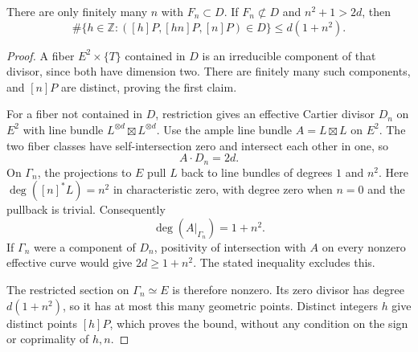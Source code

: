 \documentclass[10pt,a4paper]{article}
\newcommand{\Z}{\mathbb Z}\newcommand{\Q}{\mathbb Q}
\begin{document}
\begin{proposition}\label{prop:bound}
There are only finitely many $n$ with $F_n\subset D$.
If $F_n\not\subset D$ and $n^2+1>2d$, then
\[
 \#\{h\in\Z:([h]P,[hn]P,[n]P)\in D\}
                       \le d(1+n^2).
\]
\end{proposition}
\begin{proof}
A fiber $E^2\times\{T\}$ contained in $D$ is an irreducible component
of that divisor, since both have dimension two. There are finitely
many such components, and $[n]P$ are distinct, proving the first claim.

For a fiber not contained in $D$, restriction gives an effective
Cartier divisor $D_n$ on $E^2$ with line bundle
$L^{\otimes d}\boxtimes L^{\otimes d}$. Use the ample line bundle
$A=L\boxtimes L$ on $E^2$. The two fiber classes have self-intersection
zero and intersect each other in one, so
\[
                          A\cdot D_n=2d.
\]
On $\Gamma_n$, the projections to $E$ pull $L$ back to line bundles
of degrees $1$ and $n^2$. Here $\deg([n]^*L)=n^2$ in characteristic
zero, with degree zero when $n=0$ and the pullback is trivial.
Consequently
\[
                        \deg(A|_{\Gamma_n})=1+n^2.
\]
If $\Gamma_n$ were a component of $D_n$, positivity of intersection
with $A$ on every nonzero effective curve would give $2d\ge1+n^2$.
The stated inequality excludes this.

The restricted section on $\Gamma_n\simeq E$ is therefore nonzero.
Its zero divisor has degree $d(1+n^2)$, so it has at most this many
geometric points. Distinct integers $h$ give distinct points $[h]P$,
which proves the bound, without any condition on the sign or
coprimality of $h,n$.
\end{proof}
\end{document}
